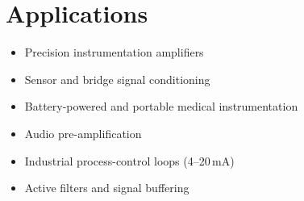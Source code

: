 \section{Applications}
\begin{itemize}
  \item Precision instrumentation amplifiers
  \item Sensor and bridge signal conditioning
  \item Battery-powered and portable medical instrumentation
  \item Audio pre-amplification
  \item Industrial process-control loops (4--20\,mA)
  \item Active filters and signal buffering
\end{itemize}

